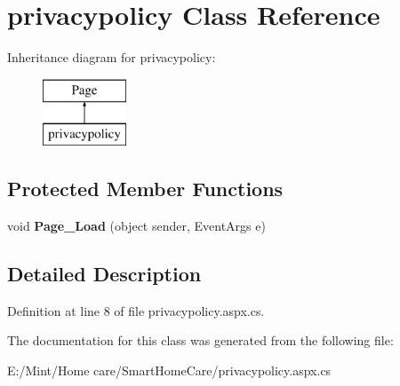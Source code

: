 \hypertarget{classprivacypolicy}{\section{privacypolicy Class Reference}
\label{classprivacypolicy}
}
Inheritance diagram for privacypolicy\-:\begin{figure}[H]
\begin{center}
\leavevmode
\includegraphics[height=2.000000cm]{classprivacypolicy}
\end{center}
\end{figure}
\subsection*{Protected Member Functions}
\begin{DoxyCompactItemize}
\item 
\hypertarget{classprivacypolicy_aaf46243bf8e6262178d1eaff5ba9b263}{void {\bfseries Page\-\_\-\-Load} (object sender, Event\-Args e)}\label{classprivacypolicy_aaf46243bf8e6262178d1eaff5ba9b263}

\end{DoxyCompactItemize}


\subsection{Detailed Description}


Definition at line 8 of file privacypolicy.\-aspx.\-cs.



The documentation for this class was generated from the following file\-:\begin{DoxyCompactItemize}
\item 
E\-:/\-Mint/\-Home care/\-Smart\-Home\-Care/privacypolicy.\-aspx.\-cs\end{DoxyCompactItemize}

